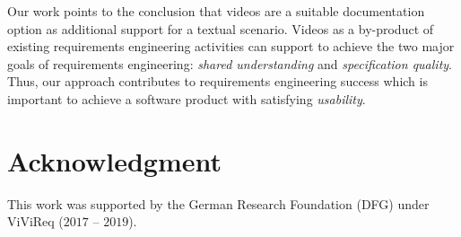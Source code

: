 \documentclass[conference]{IEEEtran}
\begin{document}
Our work points to the conclusion that videos are a suitable documentation 
option as additional support for a textual scenario. Videos as a 
by-product of existing requirements engineering activities can support to 
achieve the two major goals of requirements engineering: \textit{shared 
understanding} and \textit{specification quality}. Thus, our approach 
contributes to requirements engineering success which is important to 
achieve a software product with satisfying \textit{usability}.

\section*{Acknowledgment}
This work was supported by the German Research Foundation (DFG) under ViViReq 
($2017$ -- $2019$).



\end{document}
